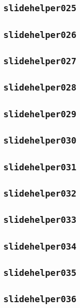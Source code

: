 \subsection{\texttt{slidehelper025}}
\newpage
\subsection{\texttt{slidehelper026}}
\newpage
\subsection{\texttt{slidehelper027}}
\newpage
\subsection{\texttt{slidehelper028}}
\newpage
\subsection{\texttt{slidehelper029}}
\newpage
\subsection{\texttt{slidehelper030}}
\newpage
\subsection{\texttt{slidehelper031}}
\newpage
\subsection{\texttt{slidehelper032}}
\newpage
\subsection{\texttt{slidehelper033}}
\newpage
\subsection{\texttt{slidehelper034}}
\newpage
\subsection{\texttt{slidehelper035}}
\newpage
\subsection{\texttt{slidehelper036}}
\newpage
